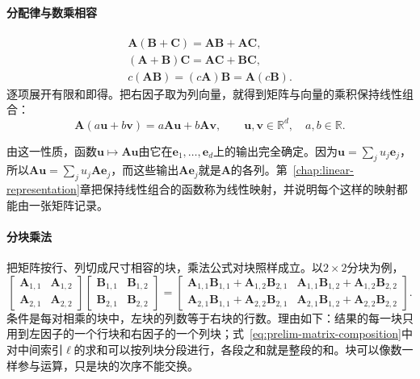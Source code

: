 \paragraph{分配律与数乘相容}
\[
 \begin{gathered}
\bm A(\bm B+\bm C)=\bm A\bm B+\bm A\bm C,\\
(\bm A+\bm B)\bm C=\bm A\bm C+\bm B\bm C,\\
c(\bm A\bm B)=(c\bm A)\bm B=\bm A(c\bm B).
 \end{gathered}
\]
逐项展开有限和即得。把右因子取为列向量，就得到矩阵与向量的乘积保持线性组合：
\begin{equation}
\bm A(a\bm u+b\bm v)=a\bm A\bm u+b\bm A\bm v,\qquad
\bm u,\bm v\in\mathbb R^d,\quad a,b\in\mathbb R.
\label{eq:prelim-matrix-linearity}
\end{equation}

由这一性质，函数$\bm u\mapsto\bm A\bm u$由它在$\bm e_1,\ldots,\bm e_d$上的输出完全确定。因为$\bm u=\sum_ju_j\bm e_j$，所以$\bm A\bm u=\sum_ju_j\bm A\bm e_j$，而这些输出$\bm A\bm e_j$就是$\bm A$的各列。第~\ref{chap:linear-representation}章把保持线性组合的函数称为线性映射，并说明每个这样的映射都能由一张矩阵记录。

\paragraph{分块乘法}
把矩阵按行、列切成尺寸相容的块，乘法公式对块照样成立。以$2\times2$分块为例，
\[
 \begin{bmatrix}\bm A_{1,1}&\bm A_{1,2}\\\bm A_{2,1}&\bm A_{2,2}\end{bmatrix}
 \begin{bmatrix}\bm B_{1,1}&\bm B_{1,2}\\\bm B_{2,1}&\bm B_{2,2}\end{bmatrix}
 =\begin{bmatrix}
  \bm A_{1,1}\bm B_{1,1}+\bm A_{1,2}\bm B_{2,1}&\bm A_{1,1}\bm B_{1,2}+\bm A_{1,2}\bm B_{2,2}\\
  \bm A_{2,1}\bm B_{1,1}+\bm A_{2,2}\bm B_{2,1}&\bm A_{2,1}\bm B_{1,2}+\bm A_{2,2}\bm B_{2,2}
 \end{bmatrix}.
\]
条件是每对相乘的块中，左块的列数等于右块的行数。理由如下：结果的每一块只用到左因子的一个行块和右因子的一个列块；式~\eqref{eq:prelim-matrix-composition}中对中间索引$\ell$的求和可以按列块分段进行，各段之和就是整段的和。块可以像数一样参与运算，只是块的次序不能交换。

